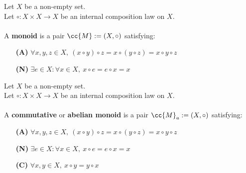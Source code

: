 \begin{definition}[Monoid]
    \label{def:monoid}
    Let \(X\) be a non-empty set.\\
    Let \(\circ: X\times X \to X\) be an internal composition law on \(X\). \\\\
    A \textbf{monoid} is a pair \(\cc{M}:= (X, \circ)\) satisfying:
    \begin{enumerate}
        \item [\textbf{(A)}] \(\forall x,y,z\in X,\ (x\circ y)\circ z= x\circ (y\circ z) = x\circ y \circ z\)
        \item [\textbf{(N)}] \(\exists e \in X : \forall x \in X,\ x\circ e = e \circ x = x\)
    \end{enumerate}
\end{definition}
\begin{definition}
    Let \(X\) be a non-empty set.\\
    Let \(\circ: X\times X \to X\) be an internal composition law on \(X\). \\\\
    A \textbf{commutative} or \textbf{abelian monoid} is a pair \(\cc{M}_a:= (X, \circ)\) satisfying:
    \begin{enumerate}
        \item [\textbf{(A)}] \(\forall x,y,z\in X,\ (x\circ y)\circ z= x\circ (y\circ z) = x\circ y \circ z\)
        \item [\textbf{(N)}] \(\exists e \in X : \forall x \in X,\ x\circ e = e \circ x = x\)
        \item [\textbf{(C)}] \(\forall x,y\in X,\ x\circ y = y\circ x\)
    \end{enumerate}
\end{definition}

\begin{definition}[Group]
    \label{def:group}
\end{definition}

\begin{definition}[Semiring]
    \label{def:semiring}
\end{definition}

\begin{definition}
    \label{def:commutative_semiring}
\end{definition}

\begin{definition}[Ring]
    \label{def:ring}
\end{definition}


